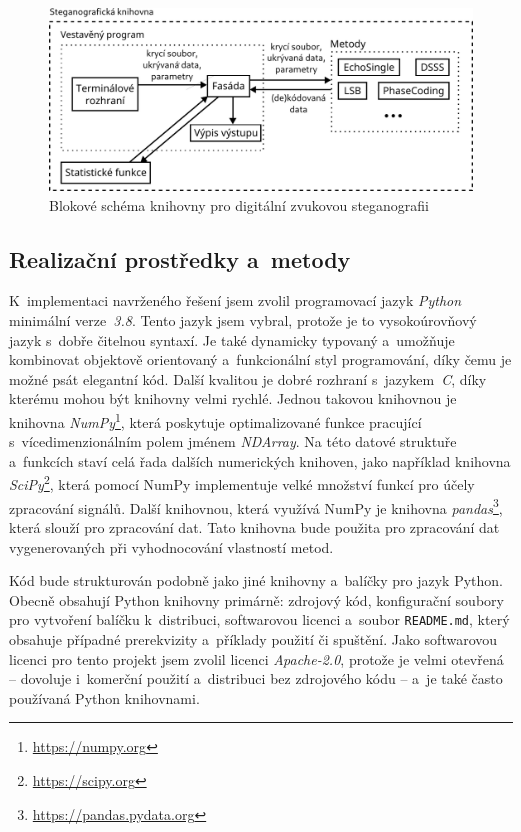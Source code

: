 \begin{figure}[hbt]
    \centering
    \includegraphics[width=\textwidth]{obrazky/block-diagram.pdf}
    \caption{Blokové schéma knihovny pro digitální zvukovou steganografii}
    \label{pic:library-block-diagram}
\end{figure}

\subsection*{Realizační prostředky a~metody}
\label{sub:solution-tool-choices}

K~implementaci navrženého řešení jsem zvolil programovací jazyk \textit{Python}
minimální verze~\textit{3.8}. Tento jazyk jsem vybral, protože je to
vysokoúrovňový jazyk s~dobře čitelnou syntaxí. Je také dynamicky typovaný
a~umožňuje kombinovat objektově orientovaný a~funkcionální styl programování,
díky čemu je možné psát elegantní kód. Další kvalitou je dobré rozhraní
s~jazykem~\textit{C}, díky kterému mohou být knihovny velmi rychlé. Jednou
takovou knihovnou je knihovna \textit{NumPy}\footnote{\url{https://numpy.org}},
která poskytuje optimalizované funkce pracující s~vícedimenzionálním polem
jménem \textit{NDArray}. Na této datové struktuře a~funkcích staví celá řada
dalších numerických knihoven, jako například knihovna
\textit{SciPy}\footnote{\url{https://scipy.org}}, která pomocí NumPy
implementuje velké množství funkcí pro účely zpracování signálů. Další
knihovnou, která využívá NumPy je knihovna
\textit{pandas}\footnote{\url{https://pandas.pydata.org}}, která slouží pro
zpracování dat. Tato knihovna bude použita pro zpracování dat vygenerovaných
při vyhodnocování vlastností metod.

Kód bude strukturován podobně jako jiné knihovny a~balíčky pro jazyk Python.
Obecně obsahují Python knihovny primárně: zdrojový kód, konfigurační soubory
pro vytvoření balíčku k~distribuci, softwarovou licenci a~soubor
\texttt{README.md}, který obsahuje případné prerekvizity a~příklady použití či
spuštění. Jako softwarovou licenci pro tento projekt jsem zvolil licenci
\textit{Apache-2.0}, protože je velmi otevřená -- dovoluje i~komerční použití
a~distribuci bez zdrojového kódu -- a~je také často používaná Python
knihovnami.

